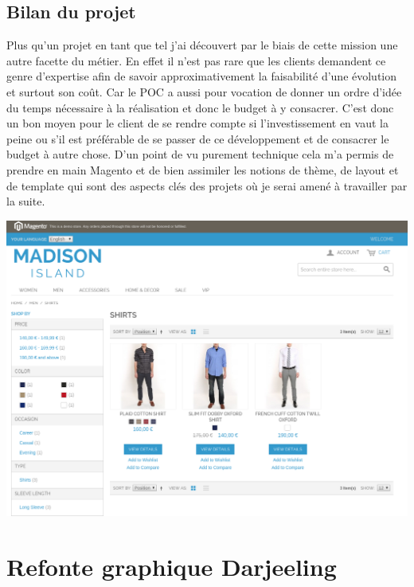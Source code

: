 \documentclass[a4paper,11pt,twoside]{report}
\begin{document}
    \subsection*{Bilan du projet}
    Plus qu'un projet en tant que tel j'ai découvert par le biais de cette mission une autre facette du métier. En effet il n'est pas rare que les clients demandent ce genre d'expertise afin de savoir approximativement la faisabilité d'une évolution et surtout son coût. Car le POC a aussi pour vocation de donner un ordre d'idée du temps nécessaire à la réalisation et donc le budget à y consacrer. C'est donc un bon moyen pour le client de se rendre compte si l'investissement en vaut la peine ou s'il est préférable de se passer de ce développement et de consacrer le budget à autre chose. D'un point de vu purement technique cela m'a permis de prendre en main Magento et de bien assimiler les notions de thème, de layout et de template qui sont des aspects clés des projets où je serai amené à travailler par la suite. 
    \begin{center}
      \includegraphics[width=\textwidth]{images/new_responsive_magento_theme.png} 
      \label{responsive_theme_magento}
    \end{center}

    \newpage
    
  \section{Refonte graphique Darjeeling}
\end{document}
